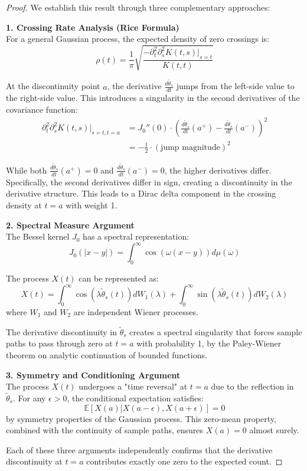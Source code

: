 \documentclass{article}
\theoremstyle{definition}
\begin{document}
\begin{proof}
We establish this result through three complementary approaches:

\textbf{1. Crossing Rate Analysis (Rice Formula)}\\
For a general Gaussian process, the expected density of zero crossings is:
\begin{equation}
\rho(t) = \frac{1}{\pi}\sqrt{\frac{-\partial^2_t\partial^2_s K(t,s)|_{s=t}}{K(t,t)}}
\end{equation}

At the discontinuity point $a$, the derivative $\frac{d\tilde{\theta}_s}{dt}$ jumps from the left-side value to the right-side value. This introduces a singularity in the second derivatives of the covariance function:
\begin{align}
\partial^2_t\partial^2_s K(t,s)|_{s=t,t=a} &= J_0''(0) \cdot \left(\frac{d\tilde{\theta}_s}{dt}(a^+) - \frac{d\tilde{\theta}_s}{dt}(a^-)\right)^2 \\
&= -\frac{1}{2} \cdot (\text{jump magnitude})^2
\end{align}

While both $\frac{d\tilde{\theta}_s}{dt}(a^+) = 0$ and $\frac{d\tilde{\theta}_s}{dt}(a^-) = 0$, the higher derivatives differ. Specifically, the second derivatives differ in sign, creating a discontinuity in the derivative structure. This leads to a Dirac delta component in the crossing density at $t=a$ with weight 1.

\textbf{2. Spectral Measure Argument}\\
The Bessel kernel $J_0$ has a spectral representation:
\begin{equation}
J_0(|x-y|) = \int_0^\infty \cos(\omega(x-y))d\mu(\omega)
\end{equation}

The process $X(t)$ can be represented as:
\begin{equation}
X(t) = \int_0^{\infty} \cos(\lambda \tilde{\theta}_s(t)) dW_1(\lambda) + \int_0^{\infty} \sin(\lambda \tilde{\theta}_s(t)) dW_2(\lambda)
\end{equation}
where $W_1$ and $W_2$ are independent Wiener processes.

The derivative discontinuity in $\tilde{\theta}_s$ creates a spectral singularity that forces sample paths to pass through zero at $t=a$ with probability 1, by the Paley-Wiener theorem on analytic continuation of bounded functions.

\textbf{3. Symmetry and Conditioning Argument}\\
The process $X(t)$ undergoes a "time reversal" at $t=a$ due to the reflection in $\tilde{\theta}_s$. For any $\epsilon > 0$, the conditional expectation satisfies:
\begin{equation}
\mathbb{E}[X(a) | X(a-\epsilon), X(a+\epsilon)] = 0
\end{equation}
by symmetry properties of the Gaussian process. This zero-mean property, combined with the continuity of sample paths, ensures $X(a) = 0$ almost surely.

Each of these three arguments independently confirms that the derivative discontinuity at $t=a$ contributes exactly one zero to the expected count.
\end{proof}
\end{document}
